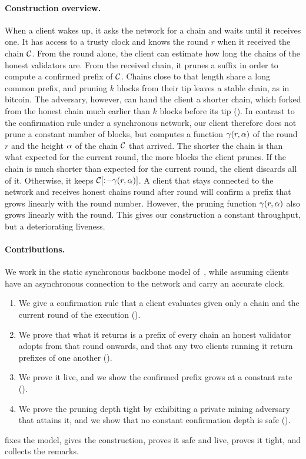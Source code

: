 

\paragraph{Construction overview.}
When a client wakes up, it asks the network for a chain and waits until it
receives one. It has access to a trusty clock and knows the round $r$ when it
received the chain $\mathcal{C}$. From the round alone, the client can estimate how
long the chains of the honest validators are. From the received chain, it
prunes a suffix in order to compute a confirmed prefix of $\mathcal{C}$. Chains close
to that length share a long common prefix, and pruning $k$ blocks from their tip
leaves a stable chain, as in bitcoin. The adversary, however, can hand the
client a shorter chain, which forked from the honest chain much earlier than $k$
blocks before its tip (). In contrast to the confirmation rule
under a synchronous network, our client therefore does not prune a constant
number of blocks, but computes a function $\gamma(r,\alpha)$ of the round $r$ and
the height $\alpha$ of the chain $\mathcal{C}$ that arrived. The shorter the chain is than
what expected for the current round, the more blocks the client prunes. If the
chain is much shorter than expected for the current round, the client discards
all of it. Otherwise, it keeps $\mathcal{C}[{:}{-}\gamma(r,\alpha)]$. A client that stays
connected to the network and receives honest chains round after round will
confirm a prefix that grows linearly with the round number.  However, the
pruning function $\gamma(r,\alpha)$ also grows linearly with the round. This gives
our construction a constant throughput, but a deteriorating liveness.

\paragraph{Contributions.}

We work in the static synchronous backbone model of~\cite{gkl24}, while assuming
clients have an asynchronous connection to the network and carry an accurate
clock.
\begin{enumerate}
    \item We give a confirmation rule that a client evaluates given only a chain
        and the current round of the execution ().
    \item We prove that what it returns is a prefix of every chain an honest
        validator adopts from that round onwards, and that any two clients
        running it return prefixes of one another ().
    \item We prove it live, and we show the confirmed prefix grows at a constant
        rate ().
    \item We prove the pruning depth tight by exhibiting a private mining adversary
        that attains it, and we show that no constant confirmation depth is
        safe ().
\end{enumerate}
 fixes the model,  gives the
construction,  proves it safe and live,
 proves it tight, and  collects the
remarks.


